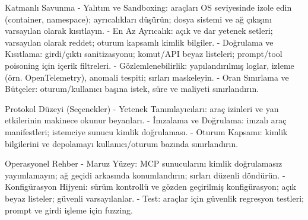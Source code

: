 Katmanlı Savunma
- Yalıtım ve Sandboxing: araçları OS seviyesinde izole edin (container, namespace); ayrıcalıkları düşürün; dosya sistemi ve ağ çıkışını varsayılan olarak kısıtlayın.
- En Az Ayrıcalık: açık ve dar yetenek setleri; varsayılan olarak reddet; oturum kapsamlı kimlik bilgiler.
- Doğrulama ve Kısıtlama: girdi/çıktı sanitizasyonu; komut/API beyaz listeleri; prompt/tool poisoning için içerik filtreleri.
- Gözlemlenebilirlik: yapılandırılmış loglar, izleme (örn. OpenTelemetry), anomali tespiti; sırları maskeleyin.
- Oran Sınırlama ve Bütçeler: oturum/kullanıcı başına istek, süre ve maliyeti sınırlandırın.

Protokol Düzeyi (Seçenekler)
- Yetenek Tanımlayıcıları: araç izinleri ve yan etkilerinin makinece okunur beyanları.
- İmzalama ve Doğrulama: imzalı araç manifestleri; istemciye sunucu kimlik doğrulaması.
- Oturum Kapsamı: kimlik bilgilerini ve depolamayı kullanıcı/oturum bazında sınırlandırın.

Operasyonel Rehber
- Maruz Yüzey: MCP sunucularını kimlik doğrulamasız yayımlamayın; ağ geçidi arkasında konumlandırın; sırları düzenli döndürün.
- Konfigürasyon Hijyeni: sürüm kontrollü ve gözden geçirilmiş konfigürasyon; açık beyaz listeler; güvenli varsayılanlar.
- Test: araçlar için güvenlik regresyon testleri; prompt ve girdi işleme için fuzzing.

